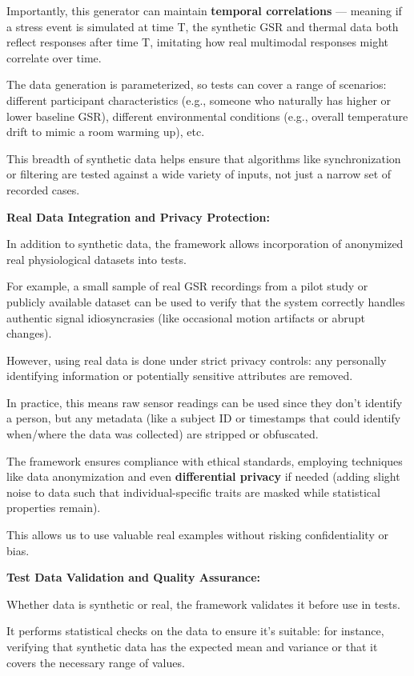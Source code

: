 {{{Importantly, this generator can maintain \textbf{temporal correlations}
 --- meaning if a stress event is simulated at time T, the synthetic GSR and thermal data both reflect responses after time T, imitating how real multimodal responses might correlate over time.

The data generation is parameterized, so tests can cover a range of scenarios: different participant characteristics (e.g., someone who naturally has higher or lower baseline GSR), different environmental conditions (e.g., overall temperature drift to mimic a room warming up), etc.

This breadth of synthetic data helps ensure that algorithms like synchronization or filtering are tested against a wide variety of inputs, not just a narrow set of recorded cases.

\textbf{Real Data Integration and Privacy Protection:}

In addition to synthetic data, the framework allows incorporation of anonymized real physiological datasets into tests.

For example, a small sample of real GSR recordings from a pilot study or publicly available dataset can be used to verify that the system correctly handles authentic signal idiosyncrasies (like occasional motion artifacts or abrupt changes).

However, using real data is done under strict privacy controls: any personally identifying information or potentially sensitive attributes are removed.

In practice, this means raw sensor readings can be used since they don't identify a person, but any metadata (like a subject ID or timestamps that could identify when/where the data was collected) are stripped or obfuscated.

The framework ensures compliance with ethical standards, employing techniques like data anonymization and even \textbf{differential privacy}
 if needed (adding slight noise to data such that individual-specific traits are masked while statistical properties remain).

This allows us to use valuable real examples without risking confidentiality or bias.

\textbf{Test Data Validation and Quality Assurance:}

Whether data is synthetic or real, the framework validates it before use in tests.

It performs statistical checks on the data to ensure it's suitable: for instance, verifying that synthetic data has the expected mean and variance or that it covers the necessary range of values.

}}}
